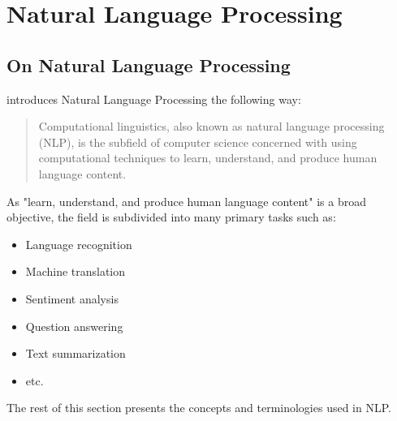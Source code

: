 \section{Natural Language Processing}
\label{sec:nlp}
\subsection{On Natural Language Processing}
\textcite{hirschbergAdvancesNaturalLanguage2015} introduces Natural Language Processing the following way:
\blockquote{Computational linguistics, also known as natural language processing (NLP), is the subfield of computer science concerned with using computational techniques to learn, understand, and produce human language content.}
As "learn, understand, and produce human language content" is a broad objective, the field is subdivided into many primary tasks such as:

\begin{itemize}
    \item Language recognition
    \item Machine translation
    \item Sentiment analysis
    \item Question answering
    \item Text summarization
    \item etc.
\end{itemize}

The rest of this section presents the concepts and terminologies used in NLP.


